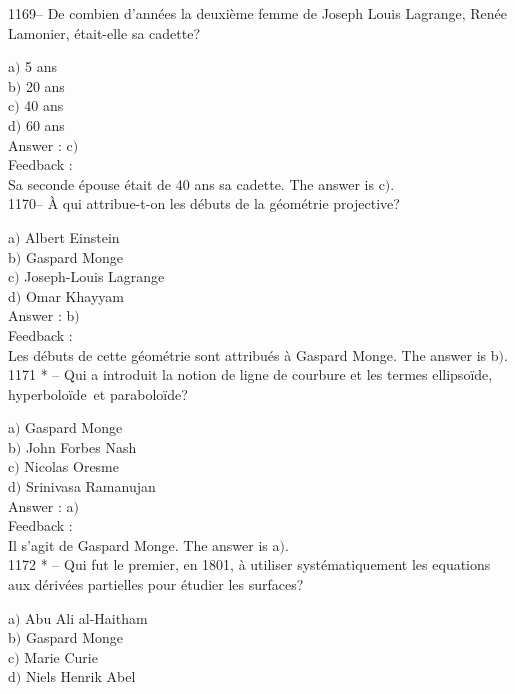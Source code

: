 \documentclass[letterpaper, 12pt]{article}
\begin{document}
1169-- De combien d'ann\'ees la deuxi\`eme femme de Joseph Louis
Lagrange, Ren\'ee Lamonier, \'etait-elle sa cadette?

a$)$ 5 ans \\
b$)$ 20 ans \\
c$)$ 40 ans \\
d$)$ 60 ans\\

Answer : c$)$\\

Feedback : \\
Sa seconde \'epouse \'etait de 40 ans sa cadette.
The answer is c$)$.\\

1170-- \`A qui attribue-t-on les d\'ebuts de la g\'eom\'etrie
projective?

a$)$ Albert Einstein \\
b$)$ Gaspard Monge \\
c$)$ Joseph-Louis Lagrange \\
d$)$ Omar Khayyam\\

Answer : b$)$\\

Feedback : \\
Les d\'ebuts de cette g\'eom\'etrie sont attribu\'es \`a Gaspard
Monge.
The answer is b$)$.\\

1171 * -- Qui a introduit la notion de ligne de courbure et les
termes \og ellipso\"ide\fg , \og hyperbolo\"ide\fg\ et \og
parabolo\"ide\fg ?

a$)$ Gaspard Monge \\
b$)$ John Forbes Nash \\
c$)$ Nicolas Oresme \\
d$)$ Srinivasa Ramanujan\\

Answer : a$)$\\

Feedback : \\
Il s'agit de Gaspard Monge.
The answer is a$)$.\\

1172 * -- Qui fut le premier, en 1801, \`a utiliser
syst\'ematiquement les equations aux d\'eriv\'ees partielles pour
\'etudier les surfaces?

a$)$ Abu Ali al-Haitham \\
b$)$ Gaspard Monge \\
c$)$ Marie Curie \\
d$)$ Niels Henrik Abel\\
\end{document}
